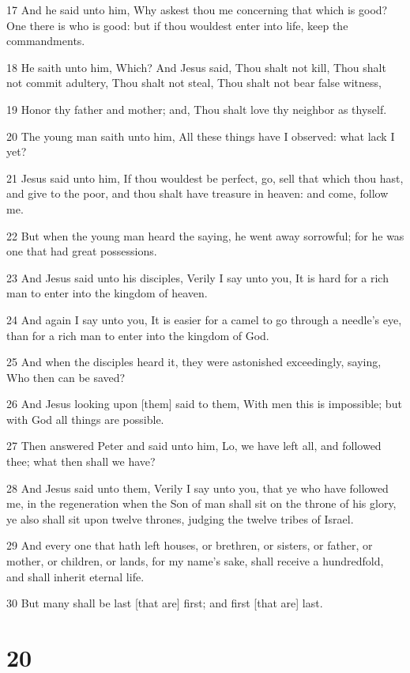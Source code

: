\par 17 And he said unto him, Why askest thou me concerning that which is good? One there is who is good: but if thou wouldest enter into life, keep the commandments.
\par 18 He saith unto him, Which? And Jesus said, Thou shalt not kill, Thou shalt not commit adultery, Thou shalt not steal, Thou shalt not bear false witness,
\par 19 Honor thy father and mother; and, Thou shalt love thy neighbor as thyself.
\par 20 The young man saith unto him, All these things have I observed: what lack I yet?
\par 21 Jesus said unto him, If thou wouldest be perfect, go, sell that which thou hast, and give to the poor, and thou shalt have treasure in heaven: and come, follow me.
\par 22 But when the young man heard the saying, he went away sorrowful; for he was one that had great possessions.
\par 23 And Jesus said unto his disciples, Verily I say unto you, It is hard for a rich man to enter into the kingdom of heaven.
\par 24 And again I say unto you, It is easier for a camel to go through a needle's eye, than for a rich man to enter into the kingdom of God.
\par 25 And when the disciples heard it, they were astonished exceedingly, saying, Who then can be saved?
\par 26 And Jesus looking upon [them] said to them, With men this is impossible; but with God all things are possible.
\par 27 Then answered Peter and said unto him, Lo, we have left all, and followed thee; what then shall we have?
\par 28 And Jesus said unto them, Verily I say unto you, that ye who have followed me, in the regeneration when the Son of man shall sit on the throne of his glory, ye also shall sit upon twelve thrones, judging the twelve tribes of Israel.
\par 29 And every one that hath left houses, or brethren, or sisters, or father, or mother, or children, or lands, for my name's sake, shall receive a hundredfold, and shall inherit eternal life.
\par 30 But many shall be last [that are] first; and first [that are] last.

\chapter{20}

